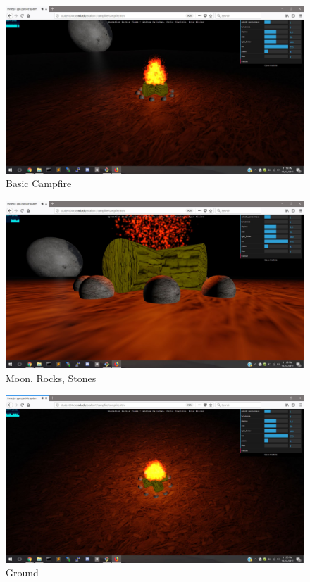 \documentclass[letterpaper]{article}
\begin{document}
\begin{figure}[H]
\centering
\includegraphics[scale=.35]{result1.JPG}
\caption{Basic Campfire}
\label{fig:result1}
\end{figure}

\begin{figure}[H]
\centering
\includegraphics[scale=.35]{result2.JPG}
\caption{Moon, Rocks, Stones}
\label{fig:result2}
\end{figure}

\begin{figure}[H]
\centering
\includegraphics[scale=.35]{result3.JPG}
\caption{Ground}
\label{fig:result3}
\end{figure}
\end{document}
